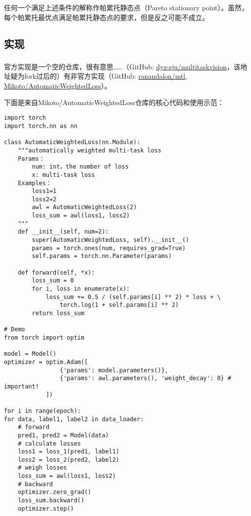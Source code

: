 \documentclass{ctexart}
\begin{document}
任何一个满足上述条件的解称作帕累托静态点（Pareto stationary point）。虽然，每个帕累托最优点满足帕累托静态点的要求，但是反之可能不成立。

\subsection{实现}

\subsubsection{}

官方实现是一个空的仓库，很有意思……（GitHub: \href{https://github.com/dyz-zju/multitaskvision}{dyz-zju/multitaskvision}，该地址疑为fork过后的）有非官方实现（GitHub: \href{https://github.com/ranandalon/mtl}{ranandalon/mtl}, \href{https://github.com/Mikoto10032/AutomaticWeightedLoss}{Mikoto/Automatic\-Weighted\-Loss}）。

下面是来自Mikoto/Automatic\-Weighted\-Loss仓库的核心代码和使用示范：
\begin{verbatim}
import torch
import torch.nn as nn

class AutomaticWeightedLoss(nn.Module):
    """automatically weighted multi-task loss
    Params：
        num: int，the number of loss
        x: multi-task loss
    Examples：
        loss1=1
        loss2=2
        awl = AutomaticWeightedLoss(2)
        loss_sum = awl(loss1, loss2)
    """
    def __init__(self, num=2):
        super(AutomaticWeightedLoss, self).__init__()
        params = torch.ones(num, requires_grad=True)
        self.params = torch.nn.Parameter(params)

    def forward(self, *x):
        loss_sum = 0
        for i, loss in enumerate(x):
            loss_sum += 0.5 / (self.params[i] ** 2) * loss + \
                torch.log(1 + self.params[i] ** 2)
        return loss_sum

# Demo
from torch import optim

model = Model()
optimizer = optim.Adam([
                {'params': model.parameters()},
                {'params': awl.parameters(), 'weight_decay': 0} # important!
            ])

for i in range(epoch):
for data, label1, label2 in data_loader:
    # forward
    pred1, pred2 = Model(data)
    # calculate losses
    loss1 = loss_1(pred1, label1)
    loss2 = loss_2(pred2, label2)
    # weigh losses
    loss_sum = awl(loss1, loss2)
    # backward
    optimizer.zero_grad()
    loss_sum.backward()
    optimizer.step()
\end{verbatim}
\end{document}

